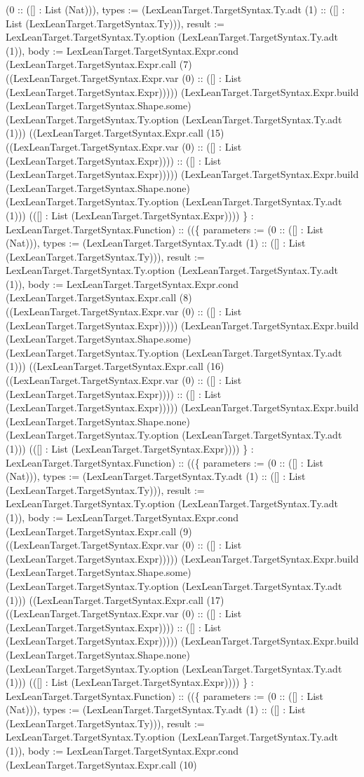\documentclass[11pt]{article}
\begin{document}
(0 :: ([] : List (Nat))), types := (LexLeanTarget.TargetSyntax.Ty.adt (1) :: ([] : List (LexLeanTarget.TargetSyntax.Ty))), result := LexLeanTarget.TargetSyntax.Ty.option (LexLeanTarget.TargetSyntax.Ty.adt (1)), body := LexLeanTarget.TargetSyntax.Expr.cond (LexLeanTarget.TargetSyntax.Expr.call (7) ((LexLeanTarget.TargetSyntax.Expr.var (0) :: ([] : List (LexLeanTarget.TargetSyntax.Expr))))) (LexLeanTarget.TargetSyntax.Expr.build (LexLeanTarget.TargetSyntax.Shape.some) (LexLeanTarget.TargetSyntax.Ty.option (LexLeanTarget.TargetSyntax.Ty.adt (1))) ((LexLeanTarget.TargetSyntax.Expr.call (15) ((LexLeanTarget.TargetSyntax.Expr.var (0) :: ([] : List (LexLeanTarget.TargetSyntax.Expr)))) :: ([] : List (LexLeanTarget.TargetSyntax.Expr))))) (LexLeanTarget.TargetSyntax.Expr.build (LexLeanTarget.TargetSyntax.Shape.none) (LexLeanTarget.TargetSyntax.Ty.option (LexLeanTarget.TargetSyntax.Ty.adt (1))) (([] : List (LexLeanTarget.TargetSyntax.Expr)))) \} : LexLeanTarget.TargetSyntax.Function) :: ((\{ parameters := (0 :: ([] : List (Nat))), types := (LexLeanTarget.TargetSyntax.Ty.adt (1) :: ([] : List (LexLeanTarget.TargetSyntax.Ty))), result := LexLeanTarget.TargetSyntax.Ty.option (LexLeanTarget.TargetSyntax.Ty.adt (1)), body := LexLeanTarget.TargetSyntax.Expr.cond (LexLeanTarget.TargetSyntax.Expr.call (8) ((LexLeanTarget.TargetSyntax.Expr.var (0) :: ([] : List (LexLeanTarget.TargetSyntax.Expr))))) (LexLeanTarget.TargetSyntax.Expr.build (LexLeanTarget.TargetSyntax.Shape.some) (LexLeanTarget.TargetSyntax.Ty.option (LexLeanTarget.TargetSyntax.Ty.adt (1))) ((LexLeanTarget.TargetSyntax.Expr.call (16) ((LexLeanTarget.TargetSyntax.Expr.var (0) :: ([] : List (LexLeanTarget.TargetSyntax.Expr)))) :: ([] : List (LexLeanTarget.TargetSyntax.Expr))))) (LexLeanTarget.TargetSyntax.Expr.build (LexLeanTarget.TargetSyntax.Shape.none) (LexLeanTarget.TargetSyntax.Ty.option (LexLeanTarget.TargetSyntax.Ty.adt (1))) (([] : List (LexLeanTarget.TargetSyntax.Expr)))) \} : LexLeanTarget.TargetSyntax.Function) :: ((\{ parameters := (0 :: ([] : List (Nat))), types := (LexLeanTarget.TargetSyntax.Ty.adt (1) :: ([] : List (LexLeanTarget.TargetSyntax.Ty))), result := LexLeanTarget.TargetSyntax.Ty.option (LexLeanTarget.TargetSyntax.Ty.adt (1)), body := LexLeanTarget.TargetSyntax.Expr.cond (LexLeanTarget.TargetSyntax.Expr.call (9) ((LexLeanTarget.TargetSyntax.Expr.var (0) :: ([] : List (LexLeanTarget.TargetSyntax.Expr))))) (LexLeanTarget.TargetSyntax.Expr.build (LexLeanTarget.TargetSyntax.Shape.some) (LexLeanTarget.TargetSyntax.Ty.option (LexLeanTarget.TargetSyntax.Ty.adt (1))) ((LexLeanTarget.TargetSyntax.Expr.call (17) ((LexLeanTarget.TargetSyntax.Expr.var (0) :: ([] : List (LexLeanTarget.TargetSyntax.Expr)))) :: ([] : List (LexLeanTarget.TargetSyntax.Expr))))) (LexLeanTarget.TargetSyntax.Expr.build (LexLeanTarget.TargetSyntax.Shape.none) (LexLeanTarget.TargetSyntax.Ty.option (LexLeanTarget.TargetSyntax.Ty.adt (1))) (([] : List (LexLeanTarget.TargetSyntax.Expr)))) \} : LexLeanTarget.TargetSyntax.Function) :: ((\{ parameters := (0 :: ([] : List (Nat))), types := (LexLeanTarget.TargetSyntax.Ty.adt (1) :: ([] : List (LexLeanTarget.TargetSyntax.Ty))), result := LexLeanTarget.TargetSyntax.Ty.option (LexLeanTarget.TargetSyntax.Ty.adt (1)), body := LexLeanTarget.TargetSyntax.Expr.cond (LexLeanTarget.TargetSyntax.Expr.call (10) 
\end{document}
